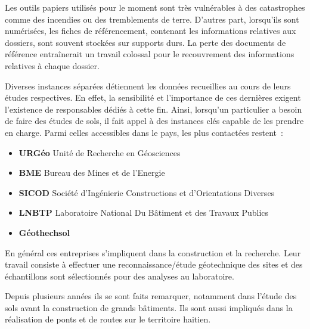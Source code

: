 \par
Les outils papiers utilisés pour le moment sont très vulnérables à des
catastrophes comme des incendies ou des tremblements de terre. D'autres
part, lorsqu'ils sont numérisées, les fiches de référencement, contenant les
informations relatives aux dossiers, sont souvent stockées sur supports
durs. La perte des documents de référence entraînerait un travail
colossal pour le recouvrement des informations relatives à chaque 
dossier.
\par
Diverses instances séparées détiennent les données recueillies au cours
de leurs études respectives. En effet, la sensibilité et l’importance de
ces dernières exigent l’existence de responsables dédiés à cette fin. 
Ainsi, lorsqu’un particulier a besoin de faire des études de sols, il 
fait appel à des instances clés capable de les prendre en charge. 
Parmi celles accessibles dans le pays, les plus contactées restent :
\begin{itemize}
    \item \textbf{URGéo}
    Unité de Recherche en Géosciences 
    \item \textbf{BME}
    Bureau des Mines et de l’Energie
    \item \textbf{SICOD}
    Société d’Ingénierie Constructions et d’Orientations Diverses
    \item \textbf{LNBTP}
    Laboratoire National Du Bâtiment et des Travaux Publics 
    \item \textbf{Géothechsol}
\end{itemize}   

\par
En général ces entreprises s'impliquent dans la construction et la recherche. 
Leur travail consiste à effectuer une reconnaissance/étude géotechnique des sites et
des échantillons  sont sélectionnés pour des analyses au laboratoire.
\par
Depuis plusieurs années ils se sont faits remarquer, notamment dans
l'étude des sols avant la construction de grands bâtiments. Ils sont aussi impliqués
dans la réalisation de ponts et de routes sur le territoire
haitien. 